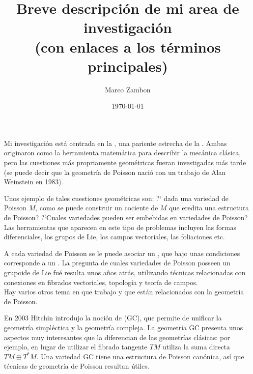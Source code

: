 \documentclass[11pt, letterpaper, oneside]{amsart}
\theoremstyle{plain}
\theoremstyle{definition}
\theoremstyle{remark}
\begin{document}
\title{Breve descripci\'on de mi area de investigaci\'on\\
(con enlaces a los t\'erminos principales)\\}
\author{ Marco Zambon}
\date{\today}

\maketitle

Mi investigaci\'on est\'a centrada en la , una pariente estrecha de la . Ambas originaron como la herramienta matem\'atica para describir la mec\'anica cl\'asica, pero las cuestiones m\'as propriamente geom\'etricas fueran investigadas m\'as tarde (se puede decir que la   geometr\'ia de Poisson naci\'o con un trabajo de Alan Weinstein en 1983). 

Unos ejemplo de tales cuestiones geom\'etricas son:  ?` dada una variedad de Poisson $M$, como se puede construir un cociente de $M$ que eredita una estructura de Poisson? ?`Cuales variedades pueden ser embebidas en variedades de Poisson?
Las herramientas que aparecen en este tipo de problemas incluyen las formas diferenciales, los grupos de Lie, los campos vectoriales, las foliaciones  etc.
 
A cada variedad de Poisson se le puede asociar un , que bajo unas condiciones corresponde a  un . La pregunta de cuales variedades de Poisson posseen un grupoide de Lie fu\'e resulta unos a\~nos atr\'as, utilizando  t\'ecnicas relacionadas con conexiones en fibrados vectoriales, topolog\'ia y teor\'ia de campos.\\

Hay varios otros tema en que trabajo y  que est\'an relacionados con la geometr\'ia de Poisson.

En 2003 Hitchin introdujo la noci\'on de  (GC), que permite de unificar la geometr\'ia simpl\'ectica y la geometr\'ia compleja. La geometr\'ia GC presenta unos aspectos 
muy interesantes que la diferencian de las geometr\'ias cl\'asicas:  por ejemplo, en lugar de utilizar el fibrado tangente $TM$ utiliza la suma directa $TM\oplus T^*M$. 
Una variedad GC tiene una estructura de Poisson can\'onica, as\'i que 
t\'ecnicas de geometr\'ia de Poisson resultan \'utiles. 
\end{document}
